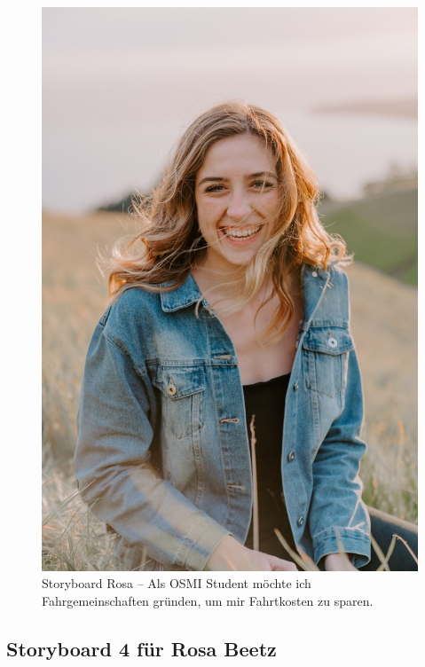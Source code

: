 \documentclass{article}
\begin{document}
\begin{figure}[h]
	\includegraphics[angle=90,width=\textwidth]{rosa}
	\centering
	\caption{Storyboard Rosa – Als OSMI Student möchte ich Fahrgemeinschaften gründen, um mir Fahrtkosten zu sparen.}
\end{figure}

\newpage

\subsection{Storyboard 4 für Rosa Beetz}
\end{document}
